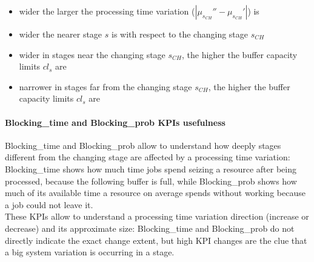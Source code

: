 \begin{itemize}
\item wider the larger the processing time variation ($|\mu_{s_{CH}}''-\mu_{s_{CH}}'|$) is
\item wider the nearer stage $s$ is with respect to the changing stage $s_{CH}$
\item wider in stages near the changing stage $s_{CH}$, the higher the buffer capacity limits $cl_s$ are 
\item narrower in stages far from the changing stage $s_{CH}$, the higher the buffer capacity limits $cl_s$ are
\end{itemize}
\paragraph{Blocking\_time and Blocking\_prob KPIs usefulness}
Blocking\_time and Blocking\_prob allow to understand how deeply stages different from the changing stage are affected by a processing time variation: Blocking\_time shows how much time jobs spend seizing a resource after being processed, because the following buffer is full, while Blocking\_prob shows how much of its available time a resource on average spends without working because a job could not leave it.\\
These KPIs allow to understand a processing time variation direction (increase or decrease) and its approximate size: Blocking\_time and Blocking\_prob do not directly indicate the exact change extent, but high KPI changes are the clue that a big system variation is occurring in a stage.
